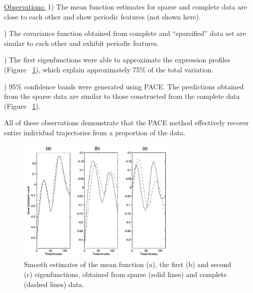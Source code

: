 \documentclass[11pt]{report}
\begin{document}
\noindent \underline{Observations:} 1) The mean function estimates for sparse and complete data are close to each other and show periodic features (not shown here).

) The covariance function obtained from complete and ``sparsified'' data set are similar to each other and exhibit periodic features. %

) The first eigenfunctions were able to approximate the expression profiles (Figure ~\ref{fig:fig8}), which explain approximately 75\% of the total variation.

) 95\% confidence bands were generated using PACE. 
The predictions obtained from the sparse data are similar to those constructed from the complete data (Figure ~\ref{fig:fig8}).

All of these observations demonstrate that the PACE method effectively recover entire individual trajectories from a proportion of the data. 

\begin{figure} 
	\centering
		\vspace{-1 cm}
	    \includegraphics[width=0.69\textwidth]{Figures/Figure8.png}
	   	\vspace{-0.5 cm}
	   	\caption{Smooth estimates of the mean function (a), the first (b) and second (c) eigenfunctions, obtained from sparse (solid lines) and complete (dashed lines) data.}
	   	\vspace{-0.5 cm}
		\label{fig:fig8}
\end{figure}
\end{document}
